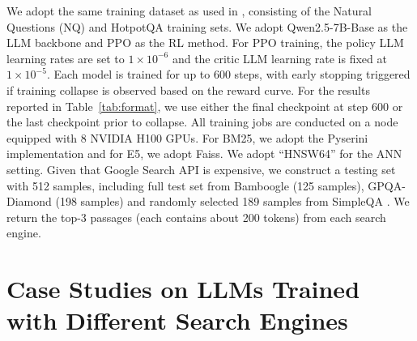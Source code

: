 We adopt the same training dataset as used in \cite{jin2025search}, consisting of the Natural Questions (NQ) and HotpotQA training sets.
We adopt Qwen2.5-7B-Base as the LLM backbone and PPO as the RL method.
For PPO training, the policy LLM learning rates are set to $1 \times 10^{-6}$ and the critic LLM learning rate is fixed at $1 \times 10^{-5}$.
Each model is trained for up to 600 steps, with early stopping triggered if training collapse is observed based on the reward curve. 
For the results reported in Table~\ref{tab:format}, we use either the final checkpoint at step 600 or the last checkpoint prior to collapse.
All training jobs are conducted on a node equipped with 8 NVIDIA H100 GPUs.
For BM25, we adopt the Pyserini implementation and for E5, we adopt Faiss.
We adopt ``HNSW64'' for the ANN setting.
Given that Google Search API is expensive, we construct a testing set with 512 samples, including full test set from Bamboogle \cite{press2022measuring} (125 samples), GPQA-Diamond \cite{rein2024gpqa} (198 samples) and randomly selected 189 samples from SimpleQA \cite{wei2024measuring}.
We return the top-3 passages (each contains about 200 tokens) from each search engine.

\section{Case Studies on LLMs Trained with Different Search Engines}\label{apx:sec:train-engine}

